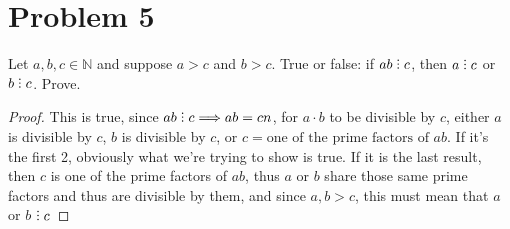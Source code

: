 \documentclass[12pt]{article}
\title{\scalebox{2}{Math 341 Exam 1}}
\author{\scalebox{1.5}{Theo Koss}}
\date{September 2020}
\newcommand{\N}{\mathbb{N}}
\newcommand{\divby}{%
  \mathrel{\text{\vbox{\baselineskip.65ex\lineskiplimit0pt\hbox{.}\hbox{.}\hbox{.}}}}%
  }
\begin{document}
\maketitle
\section{Problem 5}
Let $a,b,c\in\N$ and suppose $a>c$ and $b>c$. True or false: if $ab\divby c$, then $a\divby c$ or $b \divby c$. Prove.
\begin{proof}
This is true, since $ab\divby c \Longrightarrow ab=cn$, for $a\cdot b$ to be divisible by $c$, either $a$ is divisible by $c$, $b$ is divisible by $c$, or $c=\text{one of the prime factors of }ab$. If it's the first 2, obviously what we're trying to show is true. If it is the last result, then $c$ is one of the prime factors of $ab$, thus $a$ or $b$ share those same prime factors and thus are divisible by them, and since $a,b>c$, this must mean that $a$ or $b$ $\divby c$
\end{proof}
\end{document}
